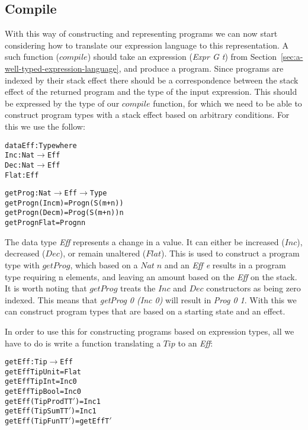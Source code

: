 \subsection{Compile}
With this way of constructing and representing programs we can now start considering how to translate our expression language to this representation. A such function ($compile$) should take an expression (\textit{Expr G t}) from Section~\ref{sec:a-well-typed-expression-language}, and produce a program. Since programs are indexed by their stack effect there should be a correspondence between the stack effect of the returned program and the type of the input expression. This should be expressed by the type of our $compile$ function, for which we need to be able to construct program types with a stack effect based on arbitrary  conditions. For this we use the follow:

\begin{alltt}
data Eff : Type where
	Inc  : Nat \(\rightarrow\)  Eff
	Dec  : Nat \(\rightarrow\)  Eff
	Flat :        Eff

getProg : Nat \(\rightarrow\)  Eff \(\rightarrow\)  Type
getProg n (Inc m) = Prog n (S (m + n))
getProg n (Dec m) = Prog (S (m + n)) n
getProg n Flat    = Prog n n
\end{alltt}

The data type \textit{Eff} represents a change in a value. It can either be increased ($Inc$), decreased ($Dec$), or remain unaltered ($Flat$). This is used to construct a program type with $getProg$, which based on a $Nat\;n$ and an \textit{Eff e} results in a program type requiring n elements, and leaving an amount based on the \textit{Eff} on the stack. It is worth noting that $getProg$ treats the $Inc$ and $Dec$ constructors as being zero indexed. This means that \textit{getProg 0 (Inc 0)} will result in \textit{Prog 0 1}. With this we can construct program types that are based on a starting state and an effect.

In order to use this for constructing programs based on expression types, all we have to do is write a function translating a $Tip$ to an \textit{Eff}:

\begin{alltt}
getEff : Tip \(\rightarrow\) Eff
getEff TipUnit        = Flat
getEff TipInt         = Inc 0
getEff TipBool        = Inc 0
getEff (TipProd T T\('\)) = Inc 1
getEff (TipSum T T\('\))  = Inc 1
getEff (TipFun T T\('\))  = getEff T\('\)
\end{alltt}


